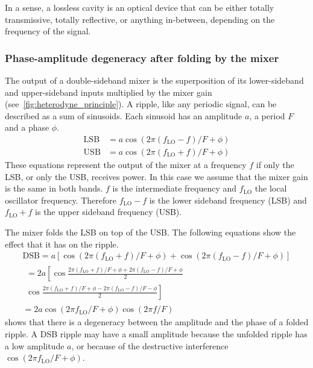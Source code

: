 In a sense, a lossless cavity is an optical device that can be either totally transmissive, totally reflective, or anything in-between, depending on the frequency of the signal.


\subsubsection{Phase-amplitude degeneracy after folding by the mixer}
The output of a double-sideband mixer is the superposition of its lower-sideband and upper-sideband inputs multiplied by the mixer gain (see~\vref{fig:heterodyne_principle}).
A ripple, like any periodic signal, can be described as a sum of sinusoids.
Each sinusoid has an amplitude $a$, a period $F$ and a phase $\phi$.
\begin{align}
    \text{LSB} &= a \cos(2\pi(f_\text{LO} - f)/F + \phi)
    \\
    \text{USB} &= a \cos(2\pi(f_\text{LO} + f)/F + \phi)
\end{align}
These equations represent the output of the mixer at a frequency $f$ if only the LSB, or only the USB, receives power.
In this case we assume that the mixer gain is the same in both bands.
$f$ is the intermediate frequency and $f_\text{LO}$ the local oscillator frequency.
Therefore $f_\text{LO} - f$ is the lower sideband frequency (LSB) and $f_\text{LO} + f$ is the upper sideband frequency (USB).

The mixer folds the LSB on top of the USB.
The following equations show the effect that it has on the ripple.
\begin{gather}
    \text{DSB} = 
        a 
        \left[
            \cos \left( 2\pi(f_\text{LO} + f)/F + \phi \right)
            +
            \cos \left( 2\pi(f_\text{LO} - f)/F + \phi \right)
        \right]
    \\
    \begin{split}
    =
        2a
        \left[
            \cos \frac{2\pi(f_\text{LO} + f)/F + \phi + 2\pi(f_\text{LO} - f)/F + \phi}{2}
        \right.\\
        \left.
            \cos \frac{2\pi(f_\text{LO} + f)/F + \phi - 2\pi(f_\text{LO} - f)/F - \phi}{2}
        \right]
    \end{split}
    \\
    = 2a \cos(2\pi f_\text{LO}/F + \phi) \cos(2\pi f/F) \label{eq:folded_cos}
\end{gather}
 shows that there is a degeneracy between the amplitude and the phase of a folded ripple.
A DSB ripple may have a small amplitude because the unfolded ripple has a low amplitude $a$, or because of the destructive interference $\cos(2\pi f_\text{LO} /F + \phi)$.

